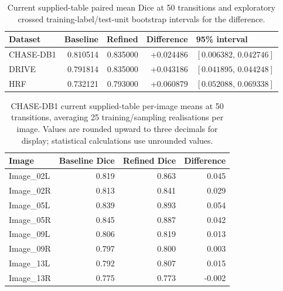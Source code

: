 \documentclass[jimaging,article,submit,pdftex,moreauthors]
  {Definitions/mdpi}
\begin{document}
\begin{table}[htbp]
\centering
\caption{Current supplied-table paired mean Dice at 50 transitions and exploratory crossed training-label/test-unit bootstrap intervals for the difference.}
\label{tab:per_image_paired_intervals}
\scriptsize
\begin{tabular}{lrrrl}
\toprule
Dataset & Baseline & Refined & Difference & 95\% interval \\
\midrule
CHASE-DB1 & 0.810514 & 0.835000 & +0.024486 & $[0.006382,\,0.042746]$ \\
DRIVE & 0.791814 & 0.835000 & +0.043186 & $[0.041895,\,0.044248]$ \\
HRF & 0.732121 & 0.793000 & +0.060879 & $[0.052088,\,0.069338]$ \\
\bottomrule
\end{tabular}
\end{table}
\begin{table}[htbp]
\centering
\caption{CHASE-DB1 current supplied-table per-image means at 50 transitions, averaging 25 training/sampling realisations per image. Values are rounded upward to three decimals for display; statistical calculations use unrounded values.}
\label{tab:chase_per_image_corrected}
\scriptsize
\begin{tabular}{lrrr}
\toprule
Image & Baseline Dice & Refined Dice & Difference \\
\midrule
Image\_02L & 0.819 & 0.863 & 0.045 \\
Image\_02R & 0.813 & 0.841 & 0.029 \\
Image\_05L & 0.839 & 0.893 & 0.054 \\
Image\_05R & 0.845 & 0.887 & 0.042 \\
Image\_09L & 0.806 & 0.819 & 0.013 \\
Image\_09R & 0.797 & 0.800 & 0.003 \\
Image\_13L & 0.792 & 0.807 & 0.015 \\
Image\_13R & 0.775 & 0.773 & -0.002 \\
\bottomrule
\end{tabular}
\end{table}
\end{document}
